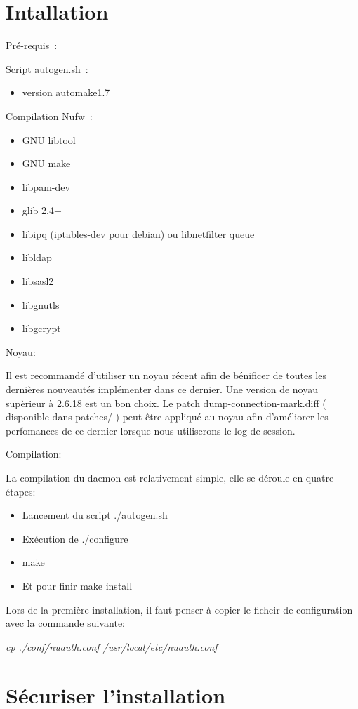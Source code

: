 \documentclass[12pt]{report}
\begin{document}
\begin{itemize}
\section{Intallation}

Pré-requis :

Script autogen.sh :
    \begin{itemize}
      \item version automake1.7
    \end{itemize}
Compilation Nufw :
  \begin{itemize}
    \item GNU libtool
    \item GNU make
    \item libpam-dev
    \item glib 2.4+
    \item libipq (iptables-dev pour debian) ou libnetfilter queue
    \item libldap
    \item libsasl2
    \item libgnutls
    \item libgcrypt
  \end{itemize}

Noyau:

Il est recommandé d'utiliser un noyau récent afin de bénificer de toutes les dernières nouveautés implémenter dans ce dernier.
Une version de noyau supèrieur à 2.6.18 est un bon choix. Le patch dump-connection-mark.diff ( disponible dans patches/ ) 
peut être appliqué au noyau afin d'améliorer les perfomances de ce dernier lorsque nous utiliserons le log de session.

Compilation:

La compilation du daemon est relativement simple, elle se déroule en quatre étapes:
  \begin{itemize}
   \item Lancement du script ./autogen.sh
   \item Exécution de ./configure
   \item make
   \item Et pour finir make install
  \end{itemize}
Lors de la première installation, il faut penser à copier le ficheir de configuration avec la commande suivante:

\textit{cp ./conf/nuauth.conf /usr/local/etc/nuauth.conf}

\section{Sécuriser l’installation}

\end{itemize}
\end{document}
